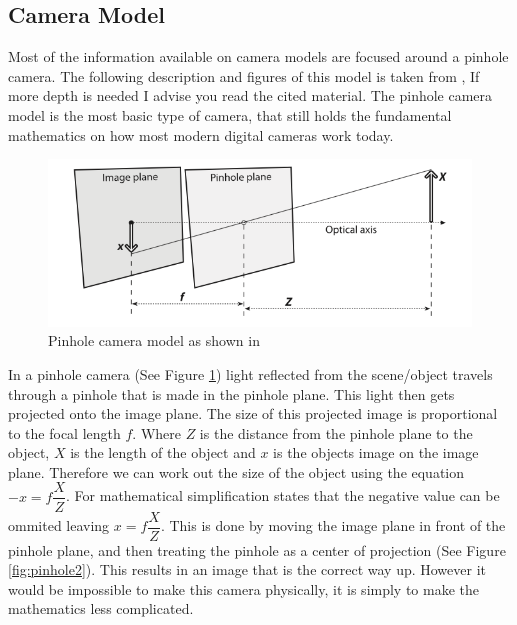 \documentclass[11pt,oneside]{report}
\begin{document}
				\subsection{Camera Model}
				Most of the information available on camera models are focused around a pinhole camera.
				The following description and figures of this model is taken from , If more depth is needed I advise you read the cited material.
				The pinhole camera model is the most basic type of camera, that still holds the fundamental mathematics on how most modern digital cameras work today.
				\begin{figure}[!ht]
				\begin{center}
					\includegraphics[width=\textwidth]{pinhole}
					\caption{Pinhole camera model as shown in \protect{} {\label{fig:pinhole}}}
				\end{center}
				\end{figure}
				In a pinhole camera (See Figure \ref{fig:pinhole}) light reflected from the scene/object travels through a pinhole that is made in the pinhole plane.
				This light then gets projected onto the image plane.
				The size of this projected image is proportional to the focal length $f$.
				Where $Z$ is the distance from the pinhole plane to the object, $X$ is the length of the object and $x$ is the objects image on the image plane.
				Therefore we can work out the size of the object using the equation $-x=f\dfrac{X}{Z}$.
				For mathematical simplification  states that the negative value can be ommited leaving $x=f\dfrac{X}{Z}$.
				This is done by moving the image plane in front of the pinhole plane, and then treating the pinhole as a center of projection (See Figure \ref{fig:pinhole2}).
				This results in an image that is the correct way up. However it would be impossible to make this camera physically, it is simply to make the mathematics less complicated.
\end{document}
